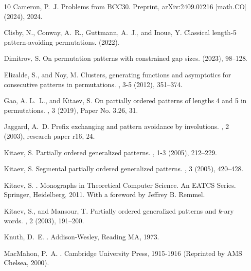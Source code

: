 \documentclass[12pt, english, a4paper]{article}
\theoremstyle{plain}
\theoremstyle{definition}
\theoremstyle{remark}
\begin{document}
\begin{thebibliography}{10}
{\sc Cameron, P.~J.}
\newblock Problems from {BCC30}.
\newblock Preprint, {arXiv}:2409.07216 [math.{CO}] (2024), 2024.

{\sc Clisby, N., Conway, A.~R., Guttmann, A.~J., and Inoue, Y.}
\newblock Classical length-5 pattern-avoiding permutations.
 (2022).

{\sc Dimitrov, S.}
\newblock On permutation patterns with constrained gap sizes.
 (2023), 98--128.

{\sc Elizalde, S., and Noy, M.}
\newblock Clusters, generating functions and asymptotics for consecutive patterns in permutations.
, 3-5 (2012), 351--374.

{\sc Gao, A. L.~L., and Kitaev, S.}
\newblock On partially ordered patterns of lengths 4 and 5 in permutations.
, 3 (2019), Paper No. 3.26, 31.

{\sc Jaggard, A.~D.}
\newblock Prefix exchanging and pattern avoidance by involutions.
, 2 (2003), research paper r16, 24.

{\sc Kitaev, S.}
\newblock Partially ordered generalized patterns.
, 1-3 (2005), 212--229.

{\sc Kitaev, S.}
\newblock Segmental partially ordered generalized patterns.
, 3 (2005), 420--428.

{\sc Kitaev, S.}
.
\newblock Monographs in Theoretical Computer Science. An EATCS Series. Springer, Heidelberg, 2011.
\newblock With a foreword by Jeffrey B. Remmel.

{\sc Kitaev, S., and Mansour, T.}
\newblock Partially ordered generalized patterns and {$k$}-ary words.
, 2 (2003), 191--200.

{\sc Knuth, D.~E.}
.
\newblock Addison-Wesley, Reading MA, 1973.

{\sc MacMahon, P.~A.}
.
\newblock Cambridge University Press, 1915-1916 (Reprinted by AMS Chelsea, 2000).


\end{thebibliography}
\end{document}

